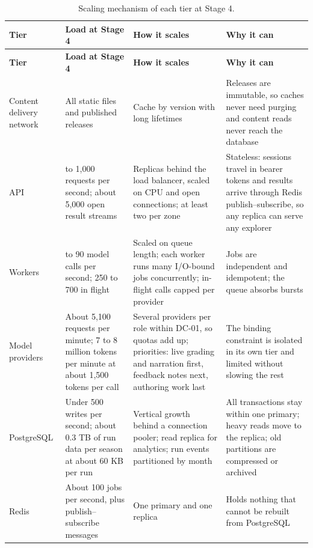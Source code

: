 {\small{}\renewcommand{\arraystretch}{1.1}
\begin{longtable}{|>{\raggedright\arraybackslash}p{}|>{\raggedright\arraybackslash}p{}|>{\raggedright\arraybackslash}p{}|>{\raggedright\arraybackslash}p{}|}
\caption{Scaling mechanism of each tier at Stage 4.} \\
\hline
\textbf{Tier} & \textbf{Load at Stage 4} & \textbf{How it scales} & \textbf{Why it can} \\ \hline
\endfirsthead
\hline
\textbf{Tier} & \textbf{Load at Stage 4} & \textbf{How it scales} & \textbf{Why it can} \\ \hline
\endhead
Content delivery network & All static files and published releases & Cache by version with long lifetimes & Releases are immutable, so caches never need purging and content reads never reach the database \\ \hline
API & 500 to 1,000 requests per second; about 5,000 open result streams & Replicas behind the load balancer, scaled on CPU and open connections; at least two per zone & Stateless: sessions travel in bearer tokens and results arrive through Redis publish--subscribe, so any replica can serve any explorer \\ \hline
Workers & 80 to 90 model calls per second; 250 to 700 in flight & Scaled on queue length; each worker runs many I/O-bound jobs concurrently; in-flight calls capped per provider & Jobs are independent and idempotent; the queue absorbs bursts\cite{r168} \\ \hline
Model providers & About 5,100 requests per minute; 7 to 8 million tokens per minute at about 1,500 tokens per call & Several providers per role within DC-01, so quotas add up; priorities: live grading and narration first, feedback notes next, authoring work last & The binding constraint is isolated in its own tier and limited without slowing the rest \\ \hline
PostgreSQL & Under 500 writes per second; about 0.3 TB of run data per season at about 60 KB per run & Vertical growth behind a connection pooler; read replica for analytics; run events partitioned by month & All transactions stay within one primary; heavy reads move to the replica; old partitions are compressed or archived \\ \hline
Redis & About 100 jobs per second, plus publish--subscribe messages & One primary and one replica & Holds nothing that cannot be rebuilt from PostgreSQL \\ \hline
\end{longtable}
}

